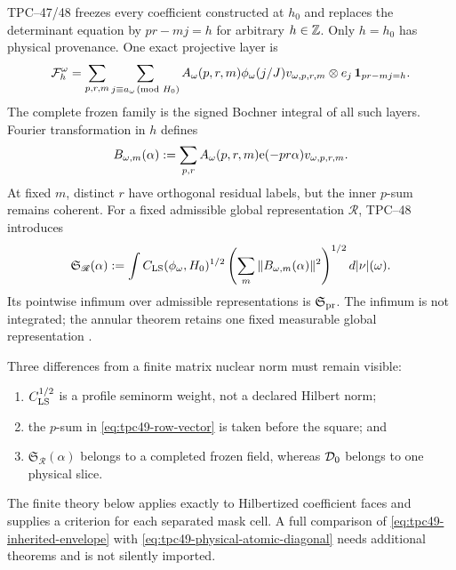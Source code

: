 TPC--47/48 freezes every coefficient constructed at \(h_0\) and
replaces the determinant equation by \(pr-mj=h\) for arbitrary
\(h\in\mathbb Z\).  Only \(h=h_0\) has physical provenance.  One exact
projective layer is
\begin{equation}
 \mathcal F_h^\omega
 =\sum_{p,r,m}
  \sum_{j\equiv a_\omega\!\!\pmod{H_0}}
 A_\omega(p,r,m)\phi_\omega(j/J)
 v_{\omega,p,r,m}\otimes e_j\,
 \mathbf 1_{pr-mj=h}.
 \label{eq:tpc49-projective-layer}
\end{equation}
The complete frozen family is the signed Bochner integral of all such
layers.  Fourier transformation in \(h\) defines
\begin{equation}
 B_{\omega,m}(\alpha)
 :=\sum_{p,r}A_\omega(p,r,m)
   \mathrm e(-pr\alpha)v_{\omega,p,r,m}.
 \label{eq:tpc49-row-vector}
\end{equation}
At fixed \(m\), distinct \(r\) have orthogonal residual labels, but the
inner \(p\)-sum remains coherent.  For a fixed admissible global
representation \(\mathscr R\), TPC--48 introduces
\begin{equation}
 \mathfrak S_{\mathscr R}(\alpha)
 :=\int C_{\rm LS}(\phi_\omega,H_0)^{1/2}
 \left(\sum_m\|B_{\omega,m}(\alpha)\|^2\right)^{1/2}
 d|\nu|(\omega).
 \label{eq:tpc49-inherited-envelope}
\end{equation}
Its pointwise infimum over admissible representations is
\(\mathfrak S_{\rm pr}\).  The infimum is not integrated; the annular
theorem retains one fixed measurable global representation
\citep{WangTPC48}.

Three differences from a finite matrix nuclear norm must remain visible:
\begin{enumerate}[label=\textup{(\alph*)},leftmargin=2.4em]
 \item \(C_{\rm LS}^{1/2}\) is a profile seminorm weight, not a declared
       Hilbert norm;
 \item the \(p\)-sum in \eqref{eq:tpc49-row-vector} is taken before the
       square; and
 \item \(\mathfrak S_{\mathscr R}(\alpha)\) belongs to a completed
       frozen field, whereas \(\mathcal D_0\) belongs to one physical slice.
\end{enumerate}
The finite theory below applies exactly to Hilbertized coefficient
faces and supplies a criterion for each separated mask cell.  A full
comparison of \eqref{eq:tpc49-inherited-envelope} with
\eqref{eq:tpc49-physical-atomic-diagonal} needs additional theorems and
is not silently imported.
